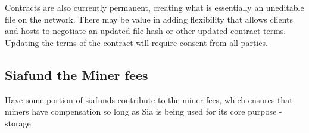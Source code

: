\documentclass[twocolumn]{article}
\begin{document}
Contracts are also currently permanent, creating what is essentially an uneditable file on the network.
There may be value in adding flexibility that allows clients and hosts to negotiate an updated file hash or other updated contract terms.
Updating the terms of the contract will require consent from all parties.




\subsection{Siafund the Miner fees}
Have some portion of siafunds contribute to the miner fees, which ensures that miners have compensation so long as Sia is being used for its core purpose - storage.

\end{document}
